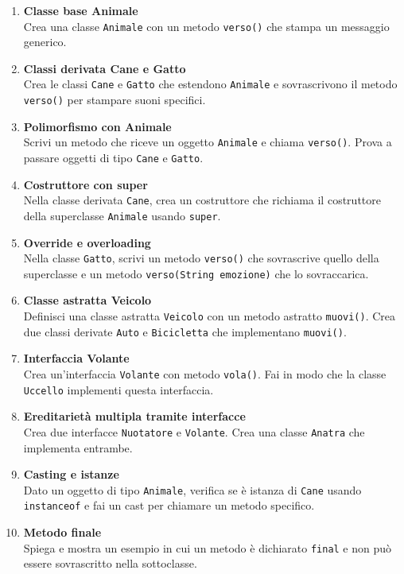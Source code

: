 \documentclass{article}
\begin{document}
\begin{enumerate}
    \item \textbf{Classe base Animale} \\
    Crea una classe \texttt{Animale} con un metodo \texttt{verso()} che stampa un messaggio generico.

    \item \textbf{Classi derivata Cane e Gatto} \\
    Crea le classi \texttt{Cane} e \texttt{Gatto} che estendono \texttt{Animale} e sovrascrivono il metodo \texttt{verso()} per stampare suoni specifici.

    \item \textbf{Polimorfismo con Animale} \\
    Scrivi un metodo che riceve un oggetto \texttt{Animale} e chiama \texttt{verso()}. Prova a passare oggetti di tipo \texttt{Cane} e \texttt{Gatto}.

    \item \textbf{Costruttore con super} \\
    Nella classe derivata \texttt{Cane}, crea un costruttore che richiama il costruttore della superclasse \texttt{Animale} usando \texttt{super}.

    \item \textbf{Override e overloading} \\
    Nella classe \texttt{Gatto}, scrivi un metodo \texttt{verso()} che sovrascrive quello della superclasse e un metodo \texttt{verso(String emozione)} che lo sovraccarica.

    \item \textbf{Classe astratta Veicolo} \\
    Definisci una classe astratta \texttt{Veicolo} con un metodo astratto \texttt{muovi()}. Crea due classi derivate \texttt{Auto} e \texttt{Bicicletta} che implementano \texttt{muovi()}.

    \item \textbf{Interfaccia Volante} \\
    Crea un'interfaccia \texttt{Volante} con metodo \texttt{vola()}. Fai in modo che la classe \texttt{Uccello} implementi questa interfaccia.

    \item \textbf{Ereditarietà multipla tramite interfacce} \\
    Crea due interfacce \texttt{Nuotatore} e \texttt{Volante}. Crea una classe \texttt{Anatra} che implementa entrambe.

    \item \textbf{Casting e istanze} \\
    Dato un oggetto di tipo \texttt{Animale}, verifica se è istanza di \texttt{Cane} usando \texttt{instanceof} e fai un cast per chiamare un metodo specifico.

    \item \textbf{Metodo finale} \\
    Spiega e mostra un esempio in cui un metodo è dichiarato \texttt{final} e non può essere sovrascritto nella sottoclasse.
\end{enumerate}
\end{document}
